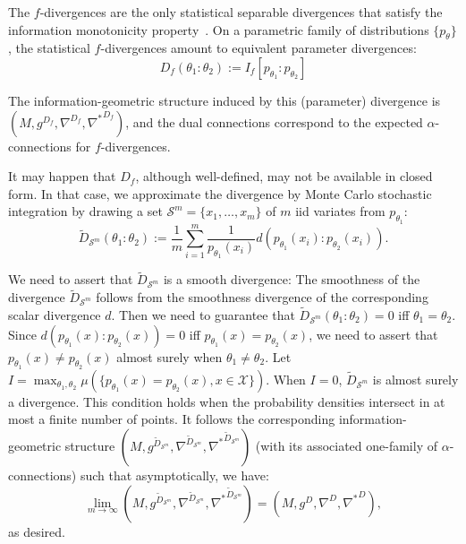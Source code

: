 \documentclass[graybox]{svmult}
\def\eqdef{:=}
\def\calS{\mathcal{S}}
\def\calX{\mathcal{X}}
\begin{document}
The $f$-divergences are the only statistical separable divergences that satisfy the information monotonicity property~\cite{IG-2016}.
On a parametric family of distributions $\{p_\theta\}$, the statistical $f$-divergences amount to equivalent parameter divergences:
\begin{equation}
D_f(\theta_1:\theta_2) \eqdef I_f[p_{\theta_1}:p_{\theta_2}]
\end{equation}

The information-geometric structure induced by this (parameter) divergence is 
$(M,{g}^{D_f},{\nabla}^{D_f},{\nabla^*}^{D_f})$, and the dual connections correspond to the expected $\alpha$-connections\cite{IG-2016}  for $f$-divergences.

It may happen that $D_f$, although well-defined, may not be available in closed form.
In that case, we approximate the divergence by Monte Carlo stochastic integration by drawing a set $\calS^m=\{x_1,\ldots, x_m\}$ of $m$ iid variates from $p_{\theta_1}$:
\begin{equation}
\tilde{D}_{\calS^m}(\theta_1:\theta_2) \eqdef \frac{1}{m} \sum_{i=1}^m \frac{1}{p_{\theta_1}(x_i)} d(p_{\theta_1}(x_i):p_{\theta_2}(x_i)). 
\end{equation}

We need to assert that $\tilde{D}_{\calS^m}$ is a smooth divergence: 
The smoothness of the divergence $\tilde{D}_{\calS^m}$ follows from the smoothness divergence of the  corresponding scalar divergence $d$. Then we need to guarantee that $\tilde{D}_{\calS^m}(\theta_1:\theta_2)=0$ iff $\theta_1=\theta_2$.
Since $d(p_{\theta_1}(x):p_{\theta_2}(x))=0$ iff $p_{\theta_1}(x)=p_{\theta_2}(x)$, we need to assert that 
$p_{\theta_1}(x)\not= p_{\theta_2}(x)$ almost surely when $\theta_1\not=\theta_2$.
Let $I=\max_{\theta_1,\theta_2} \mu(\{p_{\theta_1}(x)=p_{\theta_2}(x), x\in\calX\})$.
When $I=0$,  $\tilde{D}_{\calS^m}$ is almost surely a divergence.
This condition holds when the probability densities intersect in at most a finite number of points.
It follows the corresponding information-geometric structure 
$(M,{g}^{\tilde{D}_{\calS^m}},{\nabla}^{\tilde{D}_{\calS^m}},{\nabla^*}^{\tilde{D}_{\calS^m}})$ (with its associated one-family of $\alpha$-connections) such that asymptotically, we have:
\begin{equation}
\lim_{m\rightarrow \infty}  (M,{g}^{\tilde{D}_{\calS^m}},{\nabla}^{\tilde{D}_{\calS^m}},{\nabla^*}^{\tilde{D}_{\calS^m}}) 
=
(M,{g}^D,{\nabla}^D,{\nabla^*}^D),
\end{equation}
as desired.
\end{document}
